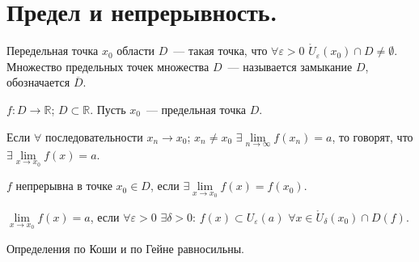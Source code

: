 \documentclass[12pt]{article}
\begin{document}
	\section{Предел и непрерывность.}
	\begin{definition}
		Передельная точка $x_0$ области $D$~--- такая точка, что $\forall \varepsilon > 0$ $\mathring{U}_{\varepsilon}(x_0) \cap D \not= \emptyset$. Множество предельных точек множества $D$~--- называется замыкание $D$, обозначается $\overline{D}$.
	\end{definition}
	\noindent
	$f: D \rightarrow \mathbb{R}$; $D \subset \mathbb{R}$. Пусть $x_0$~--- предельная точка $D$. \\
	\begin{definition}[По Гейне]
		Если $\forall$ последовательности $x_n \rightarrow x_0$; $x_n \not= x_0$ $\exists \lim \limits_{n \rightarrow \infty} f(x_n) = a$, то говорят, что $\exists \lim \limits_{x \rightarrow x_0} f(x) = a$.
	\end{definition}
	\begin{definition}
		$f$ непрерывна в точке $x_0 \in D$, если $\exists \lim \limits_{x \rightarrow x_0} f(x) = f(x_0)$.
	\end{definition}
	\begin{definition}[ПО Коши]
		$\lim \limits_{x \rightarrow x_0} f(x) = a$, если $\forall \varepsilon > 0$ $\exists \delta > 0$: $f(x) \subset U_{\varepsilon}(a)$ $\forall x \in \mathring{U}_{\delta}(x_0) \cap D(f)$.
	\end{definition}
	\begin{statement}
		Определения по Коши и по Гейне равносильны.
	\end{statement}
\end{document}
